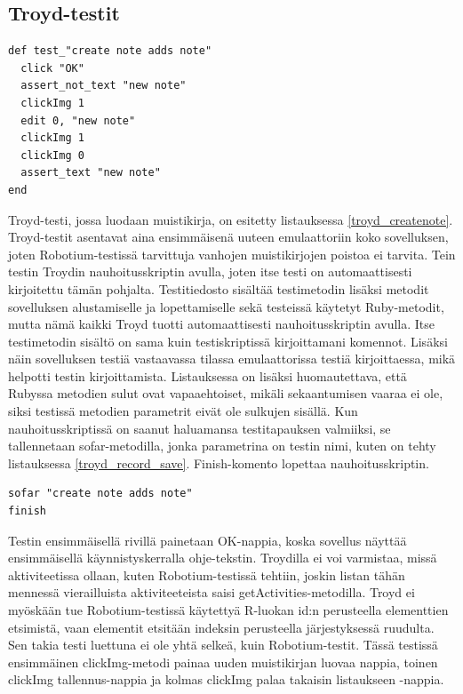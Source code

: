 \subsection{Troyd-testit}

\begin{lstlisting}[float, label=troyd_createnote,caption=Muistikirjan luontitesti Troydilla]
def test_"create note adds note"
  click "OK"
  assert_not_text "new note"
  clickImg 1
  edit 0, "new note"
  clickImg 1
  clickImg 0
  assert_text "new note"
end
\end{lstlisting}

Troyd-testi, jossa luodaan muistikirja, on esitetty listauksessa \ref{troyd_createnote}. Troyd-testit asentavat aina ensimmäisenä uuteen emulaattoriin koko sovelluksen, joten Robotium-testissä tarvittuja vanhojen muistikirjojen poistoa ei tarvita. Tein testin Troydin nauhoitusskriptin avulla, joten itse testi on automaattisesti kirjoitettu tämän pohjalta. Testitiedosto sisältää testimetodin lisäksi metodit sovelluksen alustamiselle ja lopettamiselle sekä testeissä käytetyt Ruby-metodit, mutta nämä kaikki Troyd tuotti automaattisesti nauhoitusskriptin avulla. Itse testimetodin sisältö on sama kuin testiskriptissä kirjoittamani komennot. Lisäksi näin sovelluksen testiä vastaavassa tilassa emulaattorissa testiä kirjoittaessa, mikä helpotti testin kirjoittamista. Listauksessa on lisäksi huomautettava, että Rubyssa metodien sulut ovat vapaaehtoiset, mikäli sekaantumisen vaaraa ei ole, siksi testissä metodien parametrit eivät ole sulkujen sisällä. Kun nauhoitusskriptissä on saanut haluamansa testitapauksen valmiiksi, se tallennetaan sofar-metodilla, jonka parametrina on testin nimi, kuten on tehty listauksessa \ref{troyd_record_save}. Finish-komento lopettaa nauhoitusskriptin.

\begin{lstlisting}[float, label=troyd_record_save,caption=Testin tallennus nauhoitusskriptistä Troydilla]
sofar "create note adds note"
finish
\end{lstlisting}

Testin ensimmäisellä rivillä painetaan OK-nappia, koska sovellus näyttää ensimmäisellä käynnistyskerralla ohje-tekstin. Troydilla ei voi varmistaa, missä aktiviteetissa ollaan, kuten Robotium-testissä tehtiin, joskin listan tähän mennessä vierailluista aktiviteeteista saisi getActivities-metodilla. Troyd ei myöskään tue Robotium-testissä käytettyä R-luokan id:n perusteella elementtien etsimistä, vaan elementit etsitään indeksin perusteella järjestyksessä ruudulta. Sen takia testi luettuna ei ole yhtä selkeä, kuin Robotium-testit. Tässä testissä ensimmäinen clickImg-metodi painaa uuden muistikirjan luovaa nappia, toinen clickImg tallennus-nappia ja kolmas clickImg palaa takaisin listaukseen -nappia.

